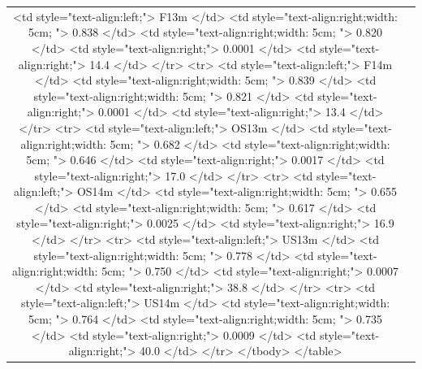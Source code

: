 \documentclass[
]{article}
\begin{document}
\begin{center}
\begin{tabular}{ c c }
   <td style="text-align:left;"> F13m </td>
   <td style="text-align:right;width: 5cm; "> 0.838 </td>
   <td style="text-align:right;width: 5cm; "> 0.820 </td>
   <td style="text-align:right;"> 0.0001 </td>
   <td style="text-align:right;"> 14.4 </td>
  </tr>
  <tr>
   <td style="text-align:left;"> F14m </td>
   <td style="text-align:right;width: 5cm; "> 0.839 </td>
   <td style="text-align:right;width: 5cm; "> 0.821 </td>
   <td style="text-align:right;"> 0.0001 </td>
   <td style="text-align:right;"> 13.4 </td>
  </tr>
  <tr>
   <td style="text-align:left;"> OS13m </td>
   <td style="text-align:right;width: 5cm; "> 0.682 </td>
   <td style="text-align:right;width: 5cm; "> 0.646 </td>
   <td style="text-align:right;"> 0.0017 </td>
   <td style="text-align:right;"> 17.0 </td>
  </tr>
  <tr>
   <td style="text-align:left;"> OS14m </td>
   <td style="text-align:right;width: 5cm; "> 0.655 </td>
   <td style="text-align:right;width: 5cm; "> 0.617 </td>
   <td style="text-align:right;"> 0.0025 </td>
   <td style="text-align:right;"> 16.9 </td>
  </tr>
  <tr>
   <td style="text-align:left;"> US13m </td>
   <td style="text-align:right;width: 5cm; "> 0.778 </td>
   <td style="text-align:right;width: 5cm; "> 0.750 </td>
   <td style="text-align:right;"> 0.0007 </td>
   <td style="text-align:right;"> 38.8 </td>
  </tr>
  <tr>
   <td style="text-align:left;"> US14m </td>
   <td style="text-align:right;width: 5cm; "> 0.764 </td>
   <td style="text-align:right;width: 5cm; "> 0.735 </td>
   <td style="text-align:right;"> 0.0009 </td>
   <td style="text-align:right;"> 40.0 </td>
  </tr>
</tbody>
</table>
\end{tabular}\end{center}
\end{document}
